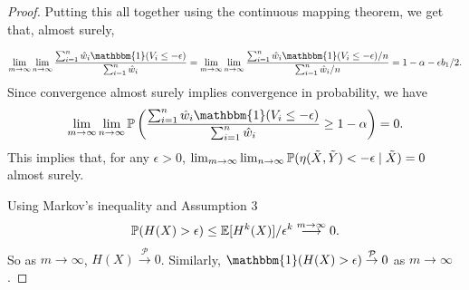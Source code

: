 \begin{proof}
Putting this all together using the continuous mapping theorem, we get that, almost surely,

\begin{align}
\lim_{m \rightarrow \infty} \lim_{n \rightarrow \infty} \frac{\sum_{i=1}^n \hat{w}_i \mathbbm{1}(V_i \leq - \epsilon) }{\sum_{i=1}^n \hat{w}_i} = \lim_{m \rightarrow \infty} \lim_{n \rightarrow \infty} \frac{\sum_{i=1}^n \hat{w}_i \mathbbm{1}(V_i \leq - \epsilon)/n }{\sum_{i=1}^n \hat{w}_i/n} = 1- \alpha - \epsilon b_1/2.
\end{align}
Since convergence almost surely implies convergence in probability, we have
\begin{align}
    \lim_{m \rightarrow \infty} \lim_{n \rightarrow \infty} \p \left( \frac{\sum_{i=1}^n \hat{w}_i \mathbbm{1}(V_i \leq - \epsilon) }{\sum_{i=1}^n \hat{w}_i} \geq 1 - \alpha \right) = 0.
\end{align}
This implies that, for any $\epsilon > 0$, $\lim_{m \rightarrow \infty} \lim_{n \rightarrow \infty} \mathbb{P}(\eta(\tilde{X}, \tilde{Y}) < -\epsilon \mid \tilde{X}) = 0$ almost surely.


Using Markov's inequality and Assumption 3
\begin{align}
    \mathbb{P}(H(X) > \epsilon) \leq \mathbb{E}[H^k(X)]/\epsilon^k \overset{m \rightarrow \infty}{\longrightarrow} 0.
\end{align}
So as $m\rightarrow \infty$, $H(X)\overset{\mathcal{P}}{\rightarrow} 0$. Similarly, $\mathbbm{1}(H(X) > \epsilon) \overset{\mathcal{P}}{\rightarrow} 0$ as $m\rightarrow \infty$.


\end{proof}
